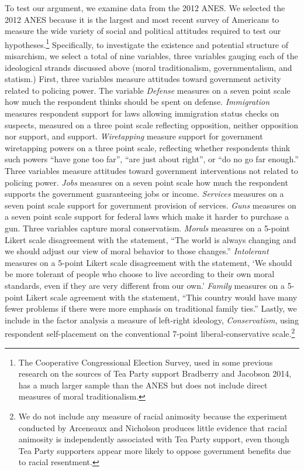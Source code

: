 \documentclass[12pt,]{article}
\begin{document}
To test our argument, we examine data from the 2012 ANES. We selected
the 2012 ANES because it is the largest and most recent survey of
Americans to measure the wide variety of social and political attitudes
required to test our hypotheses.\footnote{The Cooperative Congressional
  Election Survey, used in some previous research on the sources of Tea
  Party support Bradberry and Jacobson 2014, has a much larger sample
  than the ANES but does not include direct measures of moral
  traditionalism.} Specifically, to investigate the existence and
potential structure of misarchism, we select a total of nine variables,
three variables gauging each of the ideological strands discussed above
(moral traditionalism, governmentalism, and statism.) First, three
variables measure attitudes toward government activity related to
policing power. The variable \emph{Defense} measures on a seven point
scale how much the respondent thinks should be spent on defense.
\emph{Immigration} measures respondent support for laws allowing
immigration status checks on suspects, measured on a three point scale
reflecting opposition, neither opposition nor support, and support.
\emph{Wiretapping} measure support for government wiretapping powers on
a three point scale, reflecting whether respondents think such powers
``have gone too far'', ``are just about right'', or ``do no go far
enough.'' Three variables measure attitudes toward government
interventions not related to policing power. \emph{Jobs} measures on a
seven point scale how much the respondent supports the government
guaranteeing jobs or income. \emph{Services} measures on a seven point
scale support for government provision of services. \emph{Guns} measures
on a seven point scale support for federal laws which make it harder to
purchase a gun. Three variables capture moral conservatism.
\emph{Morals} measures on a 5-point Likert scale disagreement with the
statement, ``The world is always changing and we should adjust our view
of moral behavior to those changes.'' \emph{Intolerant} measures on a
5-point Likert scale disagreement with the statement, `We should be more
tolerant of people who choose to live according to their own moral
standards, even if they are very different from our own.' \emph{Family}
measures on a 5-point Likert scale agreement with the statement, ``This
country would have many fewer problems if there were more emphasis on
traditional family ties.'' Lastly, we include in the factor analysis a
measure of left-right ideology, \emph{Conservatism}, using respondent
self-placement on the conventional 7-point liberal-conservative
scale.\footnote{We do not include any measure of racial animosity
  because the experiment conducted by Arceneaux and Nicholson produces
  little evidence that racial animosity is independently associated with
  Tea Party support, even though Tea Party supporters appear more likely
  to oppose government benefits due to racial resentment.}
\end{document}
